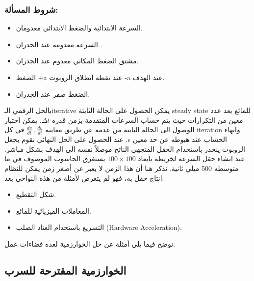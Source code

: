 \subsubsection{شروط المسألة: }
\begin{itemize}
	\item السرعة الابتدائية والضغط الابتدائي معدومان.
	\item السرعة معدومة عند الجدران .
	\item مشتق الضغط المكاني معدوم عند الجدران.
	\item الضغط +a عند نقطة انطلاق الروبوت -a عند الهدف.
	\item الضغط صفر عند الجدران.
\end{itemize}

بالحل الرقمي الـiterative يمكن الحصول على الحالة الثابتة steady state للمائع بعد عدد معين من التكرارات حيث يتم حساب السرعات المتقدمة بزمن قدره $\Delta t$. يمكن اختبار الوصول الى الحالة الثابتة من عدمه عن طريق معاينة $ \frac{dv}{dt}\ ,\frac{du}{dt} $ في كل iteration وانهاء الحساب عند هبوطه عن حد معين $ \epsilon $. عند الحصول على الحل النهائي نقوم بجعل الروبوت ينحدر باستخدام الحقل المتجهي الناتج موصلاً نفسه الى الهدف بشكل مباشر.
عند انشاء حقل السرعة لخريطة بأبعاد $ 100\times100  $ يستغرق الحاسوب الموصوف في ما متوسطه 500 ميلي ثانية. نذكر هنا أن هذا الزمن لا يعبر عن أصغر زمن يمكن للنظام انتاج حقل به، فهو لم يتعرض لأمثلة من هذه النواحي بعد:
\begin{itemize}
	\item شكل التقطيع.
	\item المعاملات الفيزيائية للمائع.
	\item التسريع باستخدام العتاد الصلب \textenglish{(Hardware Acceleration)}.
	
\end{itemize}


نوضح فيما يلي أمثلة عن حل الخوارزمية لعدة فضاءات عمل:


\subsection{الخوارزمية المقترحة للسرب}



